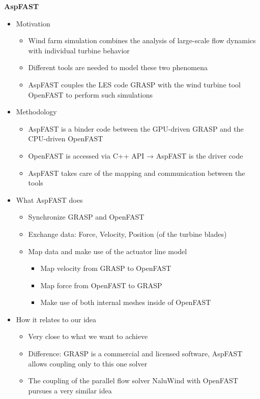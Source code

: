 \textbf{AspFAST} \cite{Taschner:2022}
\begin{itemize}
	\item Motivation
	\begin{itemize}
		\item Wind farm simulation combines the analysis of large-scale flow dynamics with individual turbine behavior
		\item Different tools are needed to model these two phenomena
		\item AspFAST couples the LES code GRASP with the wind turbine tool OpenFAST to perform such simulations
	\end{itemize}
	\item Methodology
	\begin{itemize}
		\item AspFAST is a binder code between the GPU-driven GRASP and the CPU-driven OpenFAST
		\item OpenFAST is accessed via C++ API → AspFAST is the driver code
		\item AspFAST takes care of the mapping and communication between the tools
	\end{itemize}
	\item What AspFAST does
	\begin{itemize}
		\item Synchronize GRASP and OpenFAST
		\item Exchange data: Force, Velocity, Position (of the turbine blades)
		\item Map data and make use of the actuator line model
		\begin{itemize}
			\item Map velocity from GRASP to OpenFAST
			\item Map force from OpenFAST to GRASP
			\item Make use of both internal meshes inside of OpenFAST
		\end{itemize}
	\end{itemize}
	\item How it relates to our idea
	\begin{itemize}
		\item Very close to what we want to achieve
		\item Difference: GRASP is a commercial and licensed software, AspFAST allows coupling only to this one solver
		\item The coupling of the parallel flow solver NaluWind with OpenFAST pursues a very similar idea
		\\
	\end{itemize}
\end{itemize}


